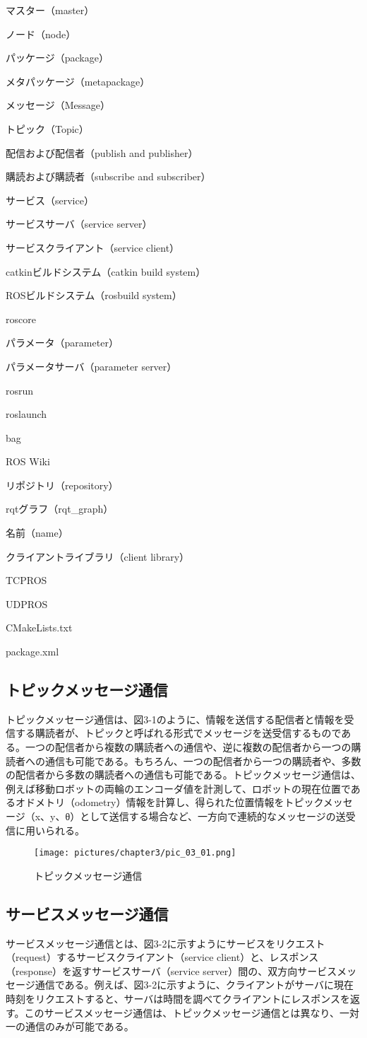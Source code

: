 \begin{term}{マスター（master）}
\begin{term}{ノード（node）}
\begin{term}{パッケージ（package）}
\begin{term}{メタパッケージ（metapackage）}
\begin{term}{メッセージ（Message）}
\begin{term}{トピック（Topic）}
\begin{term}{配信および配信者（publish and publisher）}
\begin{term}{購読および購読者（subscribe and subscriber）}
\begin{term}{サービス（service）}
\begin{term}{サービスサーバ（service server）}
\begin{term}{サービスクライアント（service client）}
\begin{term}{catkinビルドシステム（catkin build system）}
\begin{term}{ROSビルドシステム（rosbuild system）}
\begin{term}{roscore}
\begin{term}{パラメータ（parameter）}
\begin{term}{パラメータサーバ（parameter server）}
\begin{term}{rosrun}
\begin{term}{roslaunch}
\begin{term}{bag}
\begin{term}{ROS Wiki}
\begin{term}{リポジトリ（repository）}
\begin{term}{rqtグラフ（rqt\_graph）}
\begin{term}{名前（name）}
\begin{term}{クライアントライブラリ（client library）}
\begin{term}{TCPROS}
\begin{term}{UDPROS}
\begin{term}{CMakeLists.txt}
\begin{term}{package.xml}
\subsection{トピックメッセージ通信}

トピックメッセージ通信は、図3-1のように、情報を送信する配信者と情報を受信する購読者が、トピックと呼ばれる形式でメッセージを送受信するものである。一つの配信者から複数の購読者への通信や、逆に複数の配信者から一つの購読者への通信も可能である。もちろん、一つの配信者から一つの購読者や、多数の配信者から多数の購読者への通信も可能である。トピックメッセージ通信は、例えば移動ロボットの両輪のエンコーダ値を計測して、ロボットの現在位置であるオドメトリ（odometry）情報を計算し、得られた位置情報をトピックメッセージ（x、y、θ）として送信する場合など、一方向で連続的なメッセージの送受信に用いられる。

\begin{figure}[h]
  \centering
  \texttt{[image: pictures/chapter3/pic\_03\_01.png]}
  \caption{トピックメッセージ通信}
\end{figure}

\subsection{サービスメッセージ通信}
サービスメッセージ通信とは、図3-2に示すようにサービスをリクエスト（request）するサービスクライアント（service client）と、レスポンス（response）を返すサービスサーバ（service server）間の、双方向サービスメッセージ通信である。例えば、図3-2に示すように、クライアントがサーバに現在時刻をリクエストすると、サーバは時間を調べてクライアントにレスポンスを返す。このサービスメッセージ通信は、トピックメッセージ通信とは異なり、一対一の通信のみが可能である。


\end{term}
\end{term}
\end{term}
\end{term}
\end{term}
\end{term}
\end{term}
\end{term}
\end{term}
\end{term}
\end{term}
\end{term}
\end{term}
\end{term}
\end{term}
\end{term}
\end{term}
\end{term}
\end{term}
\end{term}
\end{term}
\end{term}
\end{term}
\end{term}
\end{term}
\end{term}
\end{term}
\end{term}

